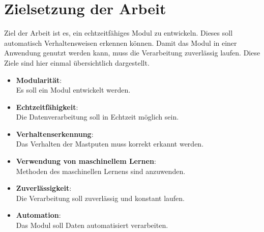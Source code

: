 \section{Zielsetzung der Arbeit} \label{sec:Zielsetzung}
Ziel der Arbeit ist es, ein echtzeitfähiges Modul zu entwickeln. Dieses soll automatisch Verhaltensweisen erkennen können. Damit das Modul in einer Anwendung genutzt werden kann, muss die Verarbeitung zuverlässig laufen. Diese Ziele sind hier einmal übersichtlich dargestellt.


\begin{itemize}
    \item \textbf{Modularität}: \\
    Es soll ein Modul entwickelt werden. 
    \item \textbf{Echtzeitfähigkeit}: \\
    Die Datenverarbeitung soll in Echtzeit möglich sein.
    \item \textbf{Verhaltenserkennung}: \\
    Das Verhalten der Mastputen muss korrekt erkannt werden.
    \item \textbf{Verwendung von maschinellem Lernen}: \\
    Methoden des maschinellen Lernens sind anzuwenden.
    \item \textbf{Zuverlässigkeit}: \\
    Die Verarbeitung soll zuverlässig und konstant laufen.
    \item \textbf{Automation}: \\
    Das Modul soll Daten automatisiert verarbeiten. 
\end{itemize}
